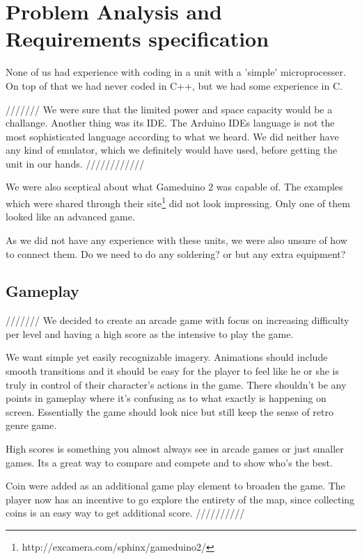 \chapter{Problem Analysis and Requirements specification}
None of us had experience with coding in a unit with a 'simple' microprocesser. On top of that we had never coded in C++, but we had some experience in C.

///////
We were sure that the limited power and space capacity would be a challange. Another thing was its IDE. The Arduino IDEs language is not the most
sophisticated language according to what we heard. We did neither have any kind of emulator, which we definitely would have used, before getting the unit in our hands.
////////////

We were also sceptical about what Gameduino 2 was capable of. The examples
which were shared through their site\footnote{http://excamera.com/sphinx/gameduino2/} did not look impressing. Only one of them
looked like an advanced game.

As we did not have any experience with these units, we were also unsure of how to connect them. Do we need to do any soldering? or but any extra equipment?

\newpage

\section{Gameplay}%
///////
We decided to create an arcade game with focus on increasing difficulty per level and having a high score as the intensive to play the game.

We want simple yet easily recognizable imagery. Animations should include smooth transitions and it should be easy for the player to feel like he or she is truly in control of their character's actions in the game. There shouldn't be any points in gameplay where it's confusing as to what exactly is happening on screen. Essentially the game should look nice but still keep the sense of retro genre game.
 
High scores is something you almost always see in arcade games or just smaller games. Its a great way to compare and compete and to show who's the best.

Coin were added as an additional game play element to broaden the game. The player now has an incentive to go explore the entirety of the map, since collecting coins is an easy way to get additional score.
//////////
